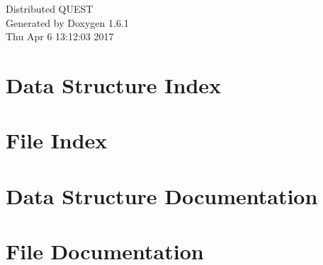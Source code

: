 \documentclass[a4paper]{article}
\begin{document}
\hypersetup{pageanchor=false}
\begin{titlepage}
\vspace*{7cm}
\begin{center}
{\Large Distributed QUEST }\\
\vspace*{1cm}
{\large Generated by Doxygen 1.6.1}\\
\vspace*{0.5cm}
{\small Thu Apr 6 13:12:03 2017}\\
\end{center}
\end{titlepage}
\tableofcontents
{}
\hypersetup{pageanchor=true}
\section{Data Structure Index}

\section{File Index}

\section{Data Structure Documentation}




\section{File Documentation}







\printindex
\end{document}
